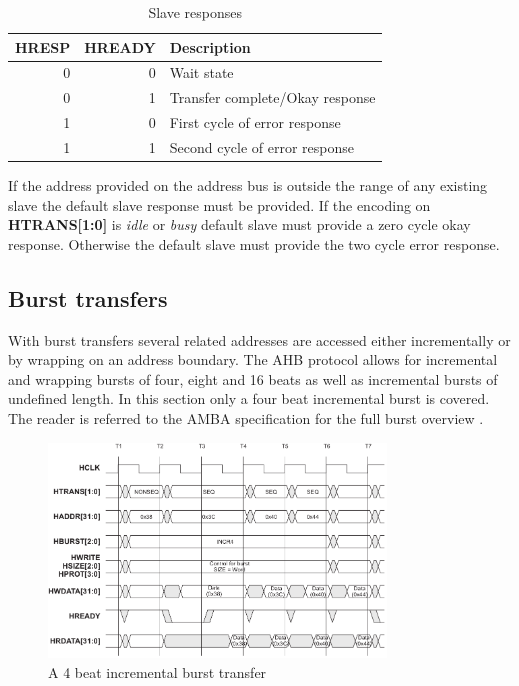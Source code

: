 \begin{table}[hbt]
  \label{tab:hsize}
  \begin{tabular}{|r|r|p{10cm}|} 
  \hline
  \textbf{HRESP} & \textbf{HREADY} & \textbf{Description} \\
    \hline
  0 & 0 & Wait state\\
    \hline
  0 & 1 & Transfer complete/Okay response \\
    \hline
  1 & 0 & First cycle of error response\\
    \hline
  1 & 1 & Second cycle of error response \\
\hline
  \end{tabular}
\caption{Slave responses}
\end{table}

If the address provided on the address bus is outside the range of any existing slave the default slave response must be provided. If the encoding on \textbf{HTRANS[1:0]} is \textit{idle} or \textit{busy} default slave must provide a zero cycle okay response. Otherwise the default slave must provide the two cycle error response. 

\subsection{Burst transfers}
With burst transfers several related addresses are accessed either incrementally or by wrapping on an address boundary. The AHB protocol allows for incremental
 and wrapping bursts of four, eight and 16 beats as well as incremental bursts of undefined length. In this section only a four beat incremental burst is covered. The reader is referred to the AMBA specification for the full burst overview \cite{amba}.

\begin{figure}[hbt]
    \begin{center}
        \includegraphics[width=0.8\textwidth]{figs/AHB/burst.png}
    \end{center}
    \caption{A 4 beat incremental burst transfer}
    \label{fig:burst}
\end{figure}

